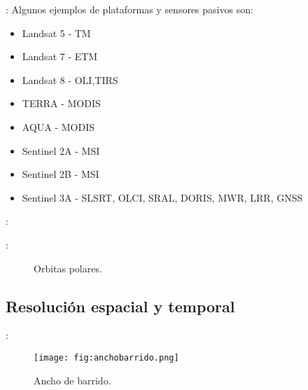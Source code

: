 \begin{frame}{\secname : \subsecname}
  Algunos ejemplos de plataformas y sensores pasivos son:
  \begin{itemize}
    \item<1->{Landsat 5 - TM}
    \item<2-> Landsat 7 - ETM
    \item<3-> Landsat 8 - OLI,TIRS
    \item<4-> TERRA - MODIS
    \item<5-> AQUA - MODIS
    \item<6-> Sentinel 2A - MSI
    \item<7-> Sentinel 2B - MSI
    \item<8-> Sentinel 3A - SLSRT, OLCI, SRAL, DORIS, MWR, LRR, GNSS
  \end{itemize}
\end{frame}

\begin{frame}{\secname : \subsecname}
\end{frame}

\begin{frame}{\secname : \subsecname}
  \begin{figure}
    \centering
    \caption{Orbitas polares.}
    \label{}
  \end{figure}
\end{frame}


\subsection{Resolución espacial y temporal}

\begin{frame}{\secname : \subsecname}
  \begin{figure}
    \centering
    \texttt{[image: fig:anchobarrido.png]}
    \caption{Ancho de barrido.}
    \label{}
  \end{figure}
\end{frame}

